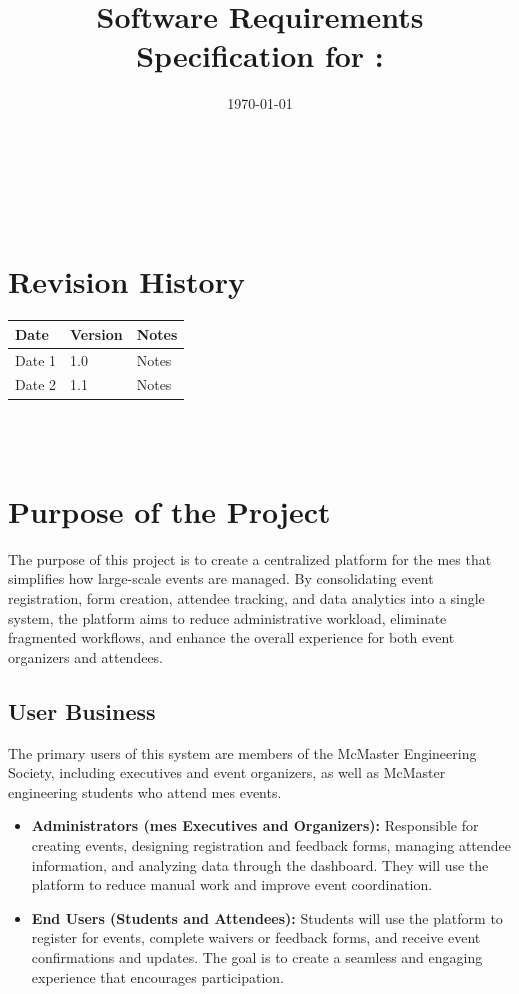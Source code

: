 \documentclass[12pt]{article}
\begin{document}
\title{Software Requirements Specification for \progname: \prjdesc}
\author{\authname}
\date{\today}

\maketitle
~\newpage

\tableofcontents

~\newpage

\section*{Revision History}

\begin{tabularx}{\textwidth}{p{3cm}p{2cm}X}
\toprule {\textbf{Date}} & {\textbf{Version}} & {\textbf{Notes}}\\
\midrule
Date 1 & 1.0 & Notes\\
Date 2 & 1.1 & Notes\\
\bottomrule
\end{tabularx}

~\\

~\newpage
\section{Purpose of the Project}

The purpose of this project is to create a centralized platform for the \gls{mes} that simplifies how large-scale events
are managed. By consolidating event registration, form creation, attendee tracking, and data analytics into a single
system, the platform aims to reduce administrative workload, eliminate fragmented workflows, and enhance the overall
experience for both event organizers and attendees.

\subsection{User Business}

The primary users of this system are members of the McMaster Engineering Society, including executives and event
organizers, as well as McMaster engineering students who attend \gls{mes} events.

\begin{itemize}
    \item \textbf{Administrators (\gls{mes} Executives and Organizers):} Responsible for creating events, designing
      registration and feedback forms, managing attendee information, and analyzing data through the dashboard. They
      will use the platform to reduce manual work and improve event coordination.
    \item \textbf{End Users (Students and Attendees):} Students will use the platform to register for events, complete
      waivers or feedback forms, and receive event confirmations and updates. The goal is to create a seamless and
      engaging experience that encourages participation.
\end{itemize}
\end{document}
